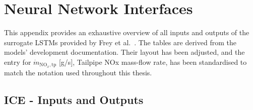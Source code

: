 
\chapter{Neural Network Interfaces}
\label{app:model_interfaces}
This appendix provides an exhaustive overview of all inputs and outputs of the surrogate LSTMs provided by Frey et al.~\cite{frey_data-based_2025}. The tables are derived from the models' development documentation. Their layout has been adjusted, and the entry for $\dot m_{\mathrm{NO}_{x},\mathrm{tp}}$ [g/s], Tailpipe NOx mass-flow rate, has been standardised to match the notation used throughout this thesis.

\section{ICE - Inputs and Outputs}

